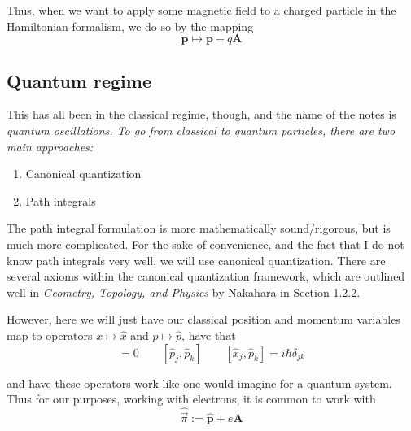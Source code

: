 \documentclass[12pt]{revtex4-2}
\begin{document}
Thus, when we want to apply some magnetic field to a charged particle in the Hamiltonian formalism, we do so by the mapping
\begin{equation}
    \boxed{\mathbf{p} \mapsto \mathbf{p} - q\mathbf{A}}
\end{equation}

\subsection{Quantum regime}

This has all been in the classical regime, though, and the name of the notes is \em quantum \em oscillations.  To go from classical to quantum particles, there are two main approaches:
\begin{enumerate}
    \item Canonical quantization
    \item Path integrals
\end{enumerate}

The path integral formulation is more mathematically sound/rigorous, but is much more complicated.  For the sake of convenience, and the fact that I do not know path integrals very well, we will use canonical quantization.  There are several axioms within the canonical quantization framework, which are outlined well in \textit{Geometry, Topology, and Physics} by Nakahara in Section 1.2.2.  

However, here we will just have our classical position and momentum variables map to operators $x \mapsto \hat{x}$ and $p \mapsto \hat{p}$, have that 
\begin{equation}
    [\hat{x}_j,\hat{x}_k] = 0 \qquad [\hat{p}_j,\hat{p}_k]  \qquad [\hat{x}_j,\hat{p}_k] = i\hbar \delta_{jk}
\end{equation}

and have these operators work like one would imagine for a quantum system.  Thus for our purposes, working with electrons, it is common to work with
\begin{equation}
    \boxed{ \hat{\vec{\pi}} := \hat{\mathbf{p}} + e\mathbf{A} }
\end{equation}

\end{document}
